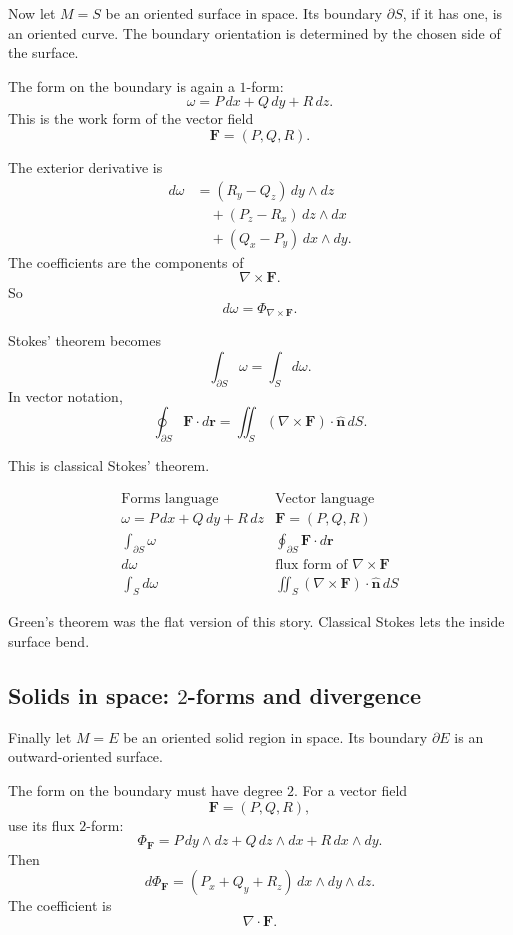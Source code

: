 Now let \(M=S\) be an oriented surface in space.  Its boundary \(\partial S\), if it has
one, is an oriented curve.  The boundary orientation is determined by the chosen side
of the surface.

The form on the boundary is again a \(1\)-form:
\[
    \omega=P\,dx+Q\,dy+R\,dz.
\]
This is the work form of the vector field
\[
    \mathbf F=(P,Q,R).
\]

The exterior derivative is
\[
\boxed{
\begin{aligned}
d\omega
&=
(R_y-Q_z)\,dy\wedge dz\\
&\quad+
(P_z-R_x)\,dz\wedge dx\\
&\quad+
(Q_x-P_y)\,dx\wedge dy.
\end{aligned}
}
\]
The coefficients are the components of
\[
    \nabla\times\mathbf F.
\]
So
\[
    d\omega
    =
    \Phi_{\nabla\times\mathbf F}.
\]

Stokes' theorem becomes
\[
    \int_{\partial S}\omega=\int_S d\omega.
\]
In vector notation,
\[
\boxed{
    \oint_{\partial S}\mathbf F\cdot d\mathbf r
    =
    \iint_S(\nabla\times\mathbf F)\cdot\widehat{\mathbf n}\,dS.
}
\]

This is classical Stokes' theorem.

\[
\begin{array}{c|c}
\text{Forms language} & \text{Vector language} \\ \hline
\omega=P\,dx+Q\,dy+R\,dz & \mathbf F=(P,Q,R)\\[1mm]
\displaystyle\int_{\partial S}\omega & \displaystyle\oint_{\partial S}\mathbf F\cdot d\mathbf r\\[3mm]
d\omega & \text{flux form of }\nabla\times\mathbf F\\[1mm]
\displaystyle\int_S d\omega &
\displaystyle\iint_S(\nabla\times\mathbf F)\cdot\widehat{\mathbf n}\,dS
\end{array}
\]

Green's theorem was the flat version of this story.  Classical Stokes lets the inside
surface bend.

\subsection{Solids in space: \(2\)-forms and divergence}

Finally let \(M=E\) be an oriented solid region in space.  Its boundary \(\partial E\)
is an outward-oriented surface.

The form on the boundary must have degree \(2\).  For a vector field
\[
    \mathbf F=(P,Q,R),
\]
use its flux \(2\)-form:
\[
\boxed{
    \Phi_{\mathbf F}
    =
    P\,dy\wedge dz+Q\,dz\wedge dx+R\,dx\wedge dy.
}
\]
Then
\[
\boxed{
    d\Phi_{\mathbf F}
    =
    (P_x+Q_y+R_z)\,dx\wedge dy\wedge dz.
}
\]
The coefficient is
\[
    \nabla\cdot\mathbf F.
\]

